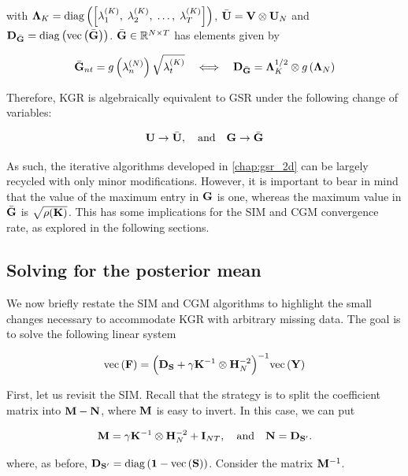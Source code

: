 with $\mathbf{\Lambda}_K = \text{\textup{diag}}\left(\left[\lambda^{(K)}_1, \; \lambda^{(K)}_2, \; \dots, \;\lambda^{(K)}_T \right]\right)$, $\bar{\mathbf{U}} = \mathbf{V} \otimes \mathbf{U}_N$ and $\mathbf{D}_{\bar{\mathbf{G}}} = \text{\textup{diag}}\left(\text{\textup{vec}}\left(\bar{\mathbf{G}}\right)\right)$. $\bar{\mathbf{G}} \in \mathbb{R}^{N \times T}$ has elements given by

\begin{equation}
    \bar{\mathbf{G}}_{nt} = g\left(\lambda^{(N)}_n\right) \sqrt{\lambda^{(K)}_t} \quad \Longleftrightarrow \quad \mathbf{D}_{\bar{\mathbf{G}}} = \mathbf{\Lambda}_K^{1/2} \otimes g\left(\mathbf{\Lambda}_N\right) 
\end{equation}


Therefore, KGR is algebraically equivalent to GSR under the following change of variables:

$$
\mathbf{U} \rightarrow \bar{\mathbf{U}}, \quad \text{and} \quad \mathbf{G} \rightarrow \bar{\mathbf{G}}
$$

As such, the iterative algorithms developed in \cref{chap:gsr_2d} can be largely recycled with only minor modifications. However, it is important to bear in mind that the value of the maximum entry in $\mathbf{G}$ is one, whereas the maximum value in $\bar{\mathbf{G}}$ is $\sqrt{\rho(\mathbf{K})}$. This has some implications for the SIM and CGM convergence rate, as explored in the following sections. 


 

\subsection{Solving for the posterior mean}

We now briefly restate the SIM and CGM algorithms to highlight the small changes necessary to accommodate KGR with arbitrary missing data. The goal is to solve the following linear system 

\begin{equation}
    \label{eq:lin_system_kgr}
    \text{\textup{vec}}\left(\mathbf{F}\right) = \Big(\mathbf{D}_{\mathbf{S}} + \gamma \mathbf{K}^{-1} \otimes \mathbf{H}_N^{-2}\Big)^{-1} \text{\textup{vec}}\left(\mathbf{Y}\right)
\end{equation}

First, let us revisit the SIM. Recall that the strategy is to split the coefficient matrix into $\mathbf{M} - \mathbf{N}$, where $\mathbf{M}$ is easy to invert. In this case, we can put

\begin{equation}
    \mathbf{M} = \gamma \mathbf{K}^{-1} \otimes \mathbf{H}_N^{-2} + \mathbf{I}_{NT}, \quad \text{and} \quad \mathbf{N} = \mathbf{D}_{\mathbf{S}'}.
\end{equation}

where, as before, $\mathbf{D}_{\mathbf{S}'} = \text{\textup{diag}}\left(\mathbf{1} - \text{\textup{vec}}\left(\mathbf{S}\right)\right)$. Consider the matrix $\mathbf{M}^{-1}$.

